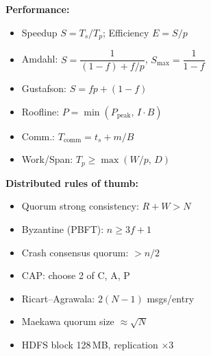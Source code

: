 \documentclass[11pt,a4paper]{article}
\begin{document}
\begin{center}
\begin{tcolorbox}[
  enhanced, colback=primary!5, colframe=primary,
  boxrule=1pt, arc=4pt, width=\textwidth,
  title={\faIcon{star}~Key Formulae \& Numbers}, fonttitle=\bfseries\large,
  colbacktitle=primary, coltitle=white
]
\begin{multicols}{2}
\textbf{\textcolor{primary}{Performance:}}
\begin{itemize}[leftmargin=*, itemsep=2pt]
  \item Speedup $S = T_s/T_p$; \; Efficiency $E = S/p$
  \item Amdahl: $S = \dfrac{1}{(1-f)+f/p}$, \; $S_{\max}=\dfrac{1}{1-f}$
  \item Gustafson: $S = fp + (1-f)$
  \item Roofline: $P = \min(P_{\text{peak}},\, I\cdot B)$
  \item Comm.: $T_{\text{comm}} = t_s + m/B$
  \item Work/Span: $T_p \ge \max(W/p,\, D)$
\end{itemize}

\columnbreak

\textbf{\textcolor{primary}{Distributed rules of thumb:}}
\begin{itemize}[leftmargin=*, itemsep=2pt]
  \item Quorum strong consistency: $R + W > N$
  \item Byzantine (PBFT): $n \ge 3f + 1$
  \item Crash consensus quorum: $> n/2$
  \item CAP: choose 2 of C, A, P
  \item Ricart--Agrawala: $2(N{-}1)$ msgs/entry
  \item Maekawa quorum size $\approx \sqrt{N}$
  \item HDFS block 128\,MB, replication $\times 3$
\end{itemize}
\end{multicols}
\end{tcolorbox}
\end{center}
\end{document}
